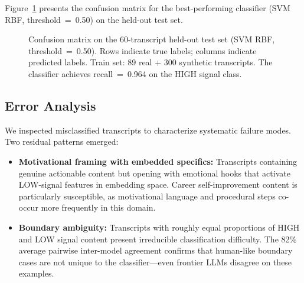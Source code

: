 \documentclass[11pt,a4paper]{article}
\begin{document}
Figure~\ref{fig:cm} presents the confusion matrix for the best-performing classifier (SVM RBF,
threshold~=~0.50) on the held-out test set.

\begin{figure}[ht]
\centering
{}
\caption{Confusion matrix on the 60-transcript held-out test set (SVM RBF, threshold~=~0.50).
Rows indicate true labels; columns indicate predicted labels. Train set: 89 real + 300 synthetic
transcripts. The classifier achieves recall~=~0.964 on the HIGH signal class.}
\label{fig:cm}
\end{figure}

\subsection{Error Analysis}

We inspected misclassified transcripts to characterize systematic failure modes. Two residual
patterns emerged:

\begin{itemize}
  \item \textbf{Motivational framing with embedded specifics:} Transcripts containing genuine
  actionable content but opening with emotional hooks that activate LOW-signal features in
  embedding space. Career self-improvement content is particularly susceptible, as motivational
  language and procedural steps co-occur more frequently in this domain.
  \item \textbf{Boundary ambiguity:} Transcripts with roughly equal proportions of HIGH and LOW
  signal content present irreducible classification difficulty. The 82\% average pairwise
  inter-model agreement confirms that human-like boundary cases are not unique to the
  classifier---even frontier LLMs disagree on these examples.
\end{itemize}
\end{document}
